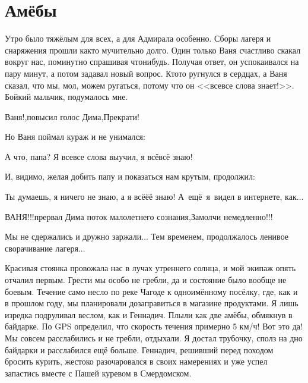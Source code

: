 \chapter{Амёбы} 
\vepsianrose

Утро было тяжёлым для всех, а для Адмирала особенно. Сборы лагеря и снаряжения прошли как\sdash то мучительно долго. Один только Ваня счастливо скакал вокруг нас, поминутно спрашивая что\sdash нибудь. Получая ответ, он успокаивался на пару минут, а потом задавал новый вопрос. Кто\sdash то ругнулся в сердцах, а Ваня сказал, что мы, мол, можем ругаться, потому что он <<все\sdash все слова знает!>>. Бойкий мальчик, подумалось мне. 


\diagdash Ваня!,\mdash повысил голос Дима,\mdash Прекрати! 

Но Ваня поймал кураж и не унимался: 

\diagdash А что, папа? Я все\sdash все слова выучил, я всё\sdash всё знаю! 

И, видимо, желая добить папу и показаться нам крутым, продолжил: 

\diagdash Ты думаешь, я ничего не знаю, а я всё\sdash ё\sdash ё знаю! А~ещё~я~видел в интернете, как$\ldots$ 

\diagdash ВАНЯ!!!\mdash прервал Дима поток малолетнего сознания,\mdash Замолчи немедленно!!! 

Мы не сдержались и  дружно заржали$\ldots$ Тем временем, продолжалось ленивое сворачивание лагеря$\ldots$ 

Красивая стоянка провожала нас в лучах утреннего солнца, и мой экипаж опять отчалил первым. Грести мы особо не гребли, да и состояние было вообще не боевым. Течение само несло по реке Чагоде к одноимённому посёлку, где, как и в прошлом году, мы планировали дозаправиться в магазине продуктами. Я лишь изредка подруливал веслом, как и Геннадич. Плыли как две амёбы, обмякнув в байдарке. По GPS определил, что скорость течения примерно 5 км/ч! Вот это да! Мы совсем расслабились и не гребли, отдыхали. Я достал трубочку, сполз на дно байдарки и расслабился ещё больше. Геннадич, решивший перед походом бросить курить, жестоко разочаровался в своих намерениях и уже успел запастись вместе с Пашей куревом в Смердомском.

